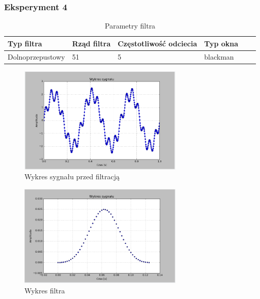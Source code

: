 \documentclass{article}
\begin{document}
{        \subsubsection{Eksperyment 4} {
            \begin{table}[h!]
            \centering
            \begin{tabular}{|l|l|l|l|l|l|}
            \hline
            Typ filtra & Rząd filtra & Częstotliwość odciecia & Typ okna  \\\hline
            Dolnoprzepustowy & 51 & 5 & blackman     \\\hline
            \end{tabular}
            \caption{Parametry filtra}
            \end{table}
            \begin{figure}[h!]
                \centering
                \includegraphics[width=0.7\textwidth]{img/sig.png}
                \caption{Wykres sygnału przed filtracją}
            \end{figure}
            \begin{figure}[h!]
                \centering
                \includegraphics[width=0.7\textwidth]{img/fil7.png}
                \caption{Wykres filtra}
            \end{figure}

}}
\end{document}
